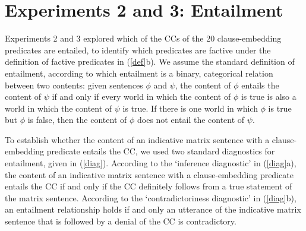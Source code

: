 \documentclass[11pt,fleqn]{article}
\newcommand{\6}{\mbox{$[\hspace*{-.6mm}[$}}
\newcommand{\9}{\mbox{$]\hspace*{-.6mm}]$}}
\begin{document}
\section{Experiments 2 and 3: Entailment}\label{s3}

Experiments 2 and 3 explored which of the CCs of the 20 clause-embedding predicates are entailed, to identify which predicates are factive under the definition of factive predicates in (\ref{def}b). We assume the standard definition of entailment, according to which entailment is a binary, categorical relation between two contents: given sentences $\phi$ and $\psi$, the content of $\phi$ entails the content of $\psi$ if and only if every world in which the content of $\phi$ is true is also a world in which the content of $\psi$ is true. If there is one world in which $\phi$ is true but $\phi$ is false, then the content of $\phi$ does not entail the content of $\psi$. 

To establish whether the content of an indicative matrix sentence with a clause-embedding predicate entails the CC, we used two standard diagnostics for entailment, given in (\ref{diag}). According to the `inference diagnostic' in (\ref{diag}a), the content of an indicative matrix sentence with a clause-embedding predicate entails the CC if and only if the CC definitely follows from a true statement of the matrix sentence. According to the `contradictoriness diagnostic' in (\ref{diag}b), an entailment relationship holds if and only an utterance of the indicative matrix sentence that is followed by a denial of the CC is contradictory. 
\end{document}
